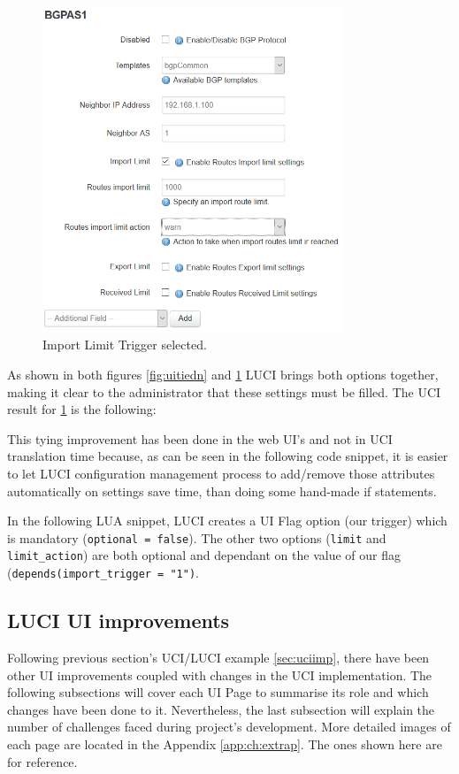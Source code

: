 \begin{itemize}
\begin{figure}[H]
    \centering
    \includegraphics[width=0.8\textwidth]{images/bgp/bgptrigger2}
    \caption{Import Limit Trigger selected.}
    \label{fig:uitiedy}
\end{figure}

As shown in both figures \ref{fig:uitiedn} and \ref{fig:uitiedy} LUCI brings both options together, making it clear to the administrator that these settings must be filled. The UCI result for \ref{fig:uitiedy} is the following:



This tying improvement has been done in the web UI's and not in UCI translation time because, as can be seen in the following code snippet, it is easier to let LUCI configuration management process to add/remove those attributes automatically on settings save time, than doing some hand-made if statements.

In the following LUA snippet, LUCI creates a UI Flag option (our trigger) which is mandatory (\texttt{optional = false}). The other two options (\texttt{limit} and \texttt{limit\_action}) are both optional and dependant on the value of our flag (\texttt{depends({import\_trigger = "1"})}.


\end{itemize}

\newpage

\subsection{LUCI UI improvements}
\label{sec:luciimp}
Following previous section's UCI/LUCI example \ref{sec:uciimp}, there have been other UI improvements coupled with changes in the UCI implementation. The following subsections will cover each UI Page to summarise its role and which changes have been done to it. Nevertheless, the last subsection will explain the number of challenges faced during project's development. More detailed images of each page are located in the Appendix \ref{app:ch:extrap}. The ones shown here are for reference.

